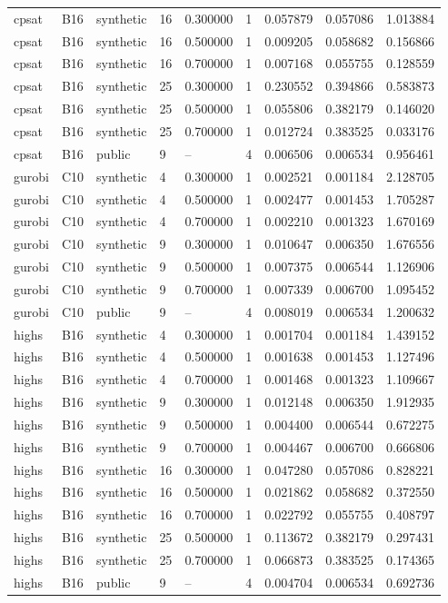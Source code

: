 \begin{tabular}{lllllllll}
cpsat & B16 & synthetic & 16 & 0.300000 & 1 & 0.057879 & 0.057086 & 1.013884 \\
cpsat & B16 & synthetic & 16 & 0.500000 & 1 & 0.009205 & 0.058682 & 0.156866 \\
cpsat & B16 & synthetic & 16 & 0.700000 & 1 & 0.007168 & 0.055755 & 0.128559 \\
cpsat & B16 & synthetic & 25 & 0.300000 & 1 & 0.230552 & 0.394866 & 0.583873 \\
cpsat & B16 & synthetic & 25 & 0.500000 & 1 & 0.055806 & 0.382179 & 0.146020 \\
cpsat & B16 & synthetic & 25 & 0.700000 & 1 & 0.012724 & 0.383525 & 0.033176 \\
cpsat & B16 & public & 9 & -- & 4 & 0.006506 & 0.006534 & 0.956461 \\
gurobi & C10 & synthetic & 4 & 0.300000 & 1 & 0.002521 & 0.001184 & 2.128705 \\
gurobi & C10 & synthetic & 4 & 0.500000 & 1 & 0.002477 & 0.001453 & 1.705287 \\
gurobi & C10 & synthetic & 4 & 0.700000 & 1 & 0.002210 & 0.001323 & 1.670169 \\
gurobi & C10 & synthetic & 9 & 0.300000 & 1 & 0.010647 & 0.006350 & 1.676556 \\
gurobi & C10 & synthetic & 9 & 0.500000 & 1 & 0.007375 & 0.006544 & 1.126906 \\
gurobi & C10 & synthetic & 9 & 0.700000 & 1 & 0.007339 & 0.006700 & 1.095452 \\
gurobi & C10 & public & 9 & -- & 4 & 0.008019 & 0.006534 & 1.200632 \\
highs & B16 & synthetic & 4 & 0.300000 & 1 & 0.001704 & 0.001184 & 1.439152 \\
highs & B16 & synthetic & 4 & 0.500000 & 1 & 0.001638 & 0.001453 & 1.127496 \\
highs & B16 & synthetic & 4 & 0.700000 & 1 & 0.001468 & 0.001323 & 1.109667 \\
highs & B16 & synthetic & 9 & 0.300000 & 1 & 0.012148 & 0.006350 & 1.912935 \\
highs & B16 & synthetic & 9 & 0.500000 & 1 & 0.004400 & 0.006544 & 0.672275 \\
highs & B16 & synthetic & 9 & 0.700000 & 1 & 0.004467 & 0.006700 & 0.666806 \\
highs & B16 & synthetic & 16 & 0.300000 & 1 & 0.047280 & 0.057086 & 0.828221 \\
highs & B16 & synthetic & 16 & 0.500000 & 1 & 0.021862 & 0.058682 & 0.372550 \\
highs & B16 & synthetic & 16 & 0.700000 & 1 & 0.022792 & 0.055755 & 0.408797 \\
highs & B16 & synthetic & 25 & 0.500000 & 1 & 0.113672 & 0.382179 & 0.297431 \\
highs & B16 & synthetic & 25 & 0.700000 & 1 & 0.066873 & 0.383525 & 0.174365 \\
highs & B16 & public & 9 & -- & 4 & 0.004704 & 0.006534 & 0.692736 \\
\hline
\end{tabular}
